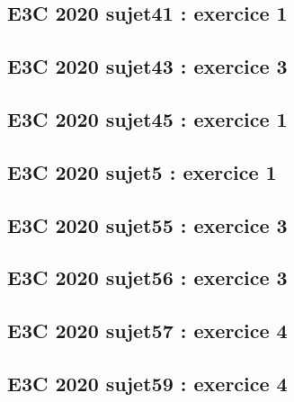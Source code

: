 \documentclass[lang=fr,edition=teacher,layout=sheet]{mxbook}
\begin{document}
\par\bigskip
{}\subsection*{E3C 2020 sujet41 : exercice 1}
\begingroup\endgroup
\par\bigskip
{}\subsection*{E3C 2020 sujet43 : exercice 3}
\begingroup\endgroup
\par\bigskip
{}\subsection*{E3C 2020 sujet45 : exercice 1}
\begingroup\endgroup
\par\bigskip
{}\subsection*{E3C 2020 sujet5 : exercice 1}
\begingroup\endgroup
\par\bigskip
{}\subsection*{E3C 2020 sujet55 : exercice 3}
\begingroup\endgroup
\par\bigskip
{}\subsection*{E3C 2020 sujet56 : exercice 3}
\begingroup\endgroup
\par\bigskip
{}\subsection*{E3C 2020 sujet57 : exercice 4}
\begingroup\endgroup
\par\bigskip
{}\subsection*{E3C 2020 sujet59 : exercice 4}
\end{document}
